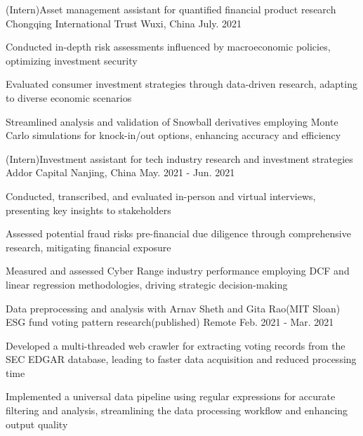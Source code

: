 \begin{cventries}
  \cventry
    {(Intern)Asset management assistant for quantified financial product research}
    {Chongqing International Trust}
    {Wuxi, China}
    {July. 2021}
    {
      \begin{cvitems}
        \item {Conducted in-depth risk assessments influenced by macroeconomic policies, optimizing investment security}
        \item {Evaluated consumer investment strategies through data-driven research, adapting to diverse economic scenarios}
        \item {Streamlined analysis and validation of Snowball derivatives employing Monte Carlo simulations for knock-in/out options, enhancing accuracy and efficiency}
      \end{cvitems}
    }

  \cventry
    {(Intern)Investment assistant for tech industry research and investment strategies}
    {Addor Capital}
    {Nanjing, China}
    {May. 2021 - Jun. 2021}
    {
      \begin{cvitems}
        \item {Conducted, transcribed, and evaluated in-person and virtual interviews, presenting key insights to stakeholders}
        \item {Assessed potential fraud risks pre-financial due diligence through comprehensive research, mitigating financial exposure}
        \item {Measured and assessed Cyber Range industry performance employing DCF and linear regression methodologies, driving strategic decision-making}
      \end{cvitems}
    }

  \cventry
    {Data preprocessing and analysis with Arnav Sheth and Gita Rao(MIT Sloan)}
    {ESG fund voting pattern research(published)}
    {Remote}
    {Feb. 2021 - Mar. 2021}
    {
      \begin{cvitems}
        \item {Developed a multi-threaded web crawler for extracting voting records from the SEC EDGAR database, leading to faster data acquisition and reduced processing time}
        \item {Implemented a universal data pipeline using regular expressions for accurate filtering and analysis, streamlining the data processing workflow and enhancing output quality}
      \end{cvitems}
    }
  

\end{cventries}

